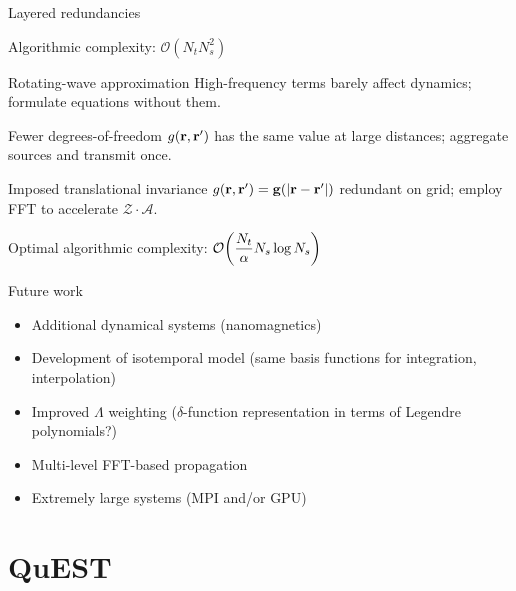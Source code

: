 \documentclass[aspectratio=169]{beamer}
\newcommand{\oper}[1]{\mathcal{#1}}
\begin{document}
\begin{frame}{Layered redundancies}
  \begin{center}
    Algorithmic complexity: $\displaystyle\mathcal{O}(N_t N_s^2)$
  \end{center}
  \begin{block}{Rotating-wave approximation}
    High-frequency terms barely affect dynamics; formulate equations without them.
  \end{block}
  \begin{block}{Fewer degrees-of-freedom}
    $g(\vb{r}, \vb{r}')$ has the same value at large distances; aggregate sources and transmit once.
  \end{block}
  \begin{block}{Imposed translational invariance}
    $g(\vb{r}, \vb{r}') = \vb{g}(\abs{\vb{r} - \vb{r}'})$ redundant on grid; employ FFT to accelerate $\oper{Z}\cdot\oper{A}$.
  \end{block}
  \begin{center}
    Optimal algorithmic complexity: $\displaystyle\mathcal{O}\qty(\frac{N_t}{\alpha} N_s \log N_s)$
  \end{center}
\end{frame}

\begin{frame}{Future work}
  \begin{itemize}
    \item Additional dynamical systems (nanomagnetics)
    \item Development of isotemporal model (same basis functions for integration, interpolation)
    \item Improved $\Lambda$ weighting ($\delta$-function representation in terms of Legendre polynomials?)
    \item Multi-level FFT-based propagation
    \item Extremely large systems (MPI and/or GPU)
  \end{itemize}
\end{frame}

\section{QuEST}
\end{document}
